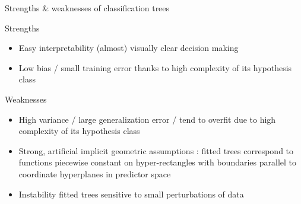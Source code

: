 

\begin{frame}{\vskip -0.2cm \Large Strengths \& weaknesses of classification trees}

\vskip 0.3cm

\scriptsize
\pause
{\large Strengths}
\vskip 0.05cm
\begin{itemize}
\pause
\item
	{\normalsize Easy interpretability}
	\vskip 0.1cm
	(almost) visually clear decision making

\vskip 0.25cm
\pause
\item
	{\normalsize Low bias / small training error}
	\vskip 0.1cm
	thanks to high complexity of its hypothesis class
\end{itemize}

\vskip 0.3cm
\pause
{\large Weaknesses}
\vskip 0.05cm
\begin{itemize}
\pause
\item
	{\normalsize High variance / large generalization error / tend to overfit}
	\vskip 0.1cm
	due to high complexity of its hypothesis class

\vskip 0.3cm
\pause
\item
	{\normalsize Strong, artificial implicit geometric assumptions :}
	\vskip 0.1cm
	fitted trees correspond to functions piecewise constant on hyper-rectangles with boundaries
	parallel to coordinate hyperplanes in predictor space
	
\vskip 0.3cm
\pause
\item
	{\normalsize Instability}
	\vskip 0.1cm
	fitted trees sensitive to small perturbations of data
\end{itemize}

\end{frame}
\normalsize


